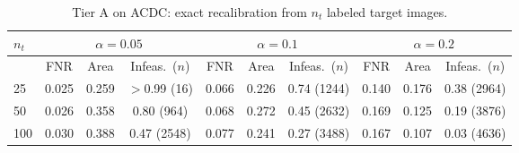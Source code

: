 \begin{table}[t]
\centering
\caption{Tier A on ACDC: exact recalibration from $n_t$ labeled target images.}
\label{tab:tier_a}
\footnotesize
\setlength{\tabcolsep}{3pt}
\begin{tabular}{lccccccccc}
\toprule
$n_t$ & \multicolumn{3}{c}{$\alpha=0.05$} & \multicolumn{3}{c}{$\alpha=0.1$} & \multicolumn{3}{c}{$\alpha=0.2$} \\
\midrule
 & FNR & Area & Infeas.\ ($n$) & FNR & Area & Infeas.\ ($n$) & FNR & Area & Infeas.\ ($n$) \\
\midrule
25 & 0.025 & 0.259 & $>$0.99 (16) & 0.066 & 0.226 & 0.74 (1244) & 0.140 & 0.176 & 0.38 (2964) \\
50 & 0.026 & 0.358 & 0.80 (964) & 0.068 & 0.272 & 0.45 (2632) & 0.169 & 0.125 & 0.19 (3876) \\
100 & 0.030 & 0.388 & 0.47 (2548) & 0.077 & 0.241 & 0.27 (3488) & 0.167 & 0.107 & 0.03 (4636) \\
\bottomrule
\end{tabular}
\end{table}
